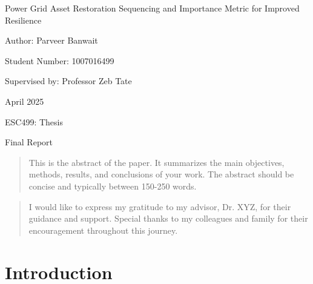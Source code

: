 \documentclass[12pt]{article}
\begin{document}
\setlength{\cftaftertoctitleskip}{2cm} %
\setlength{\cftafterloftitleskip}{2cm} %
\begin{titlepage}
    \centering %
    {\Huge Power Grid Asset Restoration Sequencing and Importance Metric for Improved Resilience \par} %
    \vspace{2cm}
    {\huge Author: Parveer Banwait \par}
    \vspace{0.25cm}
    {\large Student Number: 1007016499 \par}
    \vspace{1cm}
    {\Large Supervised by: Professor Zeb Tate \par}
    \vfill %
    {\Large April 2025 \par}
    \vspace{0.25cm}
    {\Large ESC499: Thesis \par}
    \vspace{0.25cm}
    {\Large Final Report \par}
\end{titlepage}
\vspace*{\fill}
\begin{abstract}
This is the abstract of the paper. It summarizes the main objectives, methods, results, and conclusions of your work. The abstract should be concise and typically between 150-250 words.
\end{abstract}
\vspace*{\fill}
\newpage
\renewcommand{\abstractname}{Acknowledgements}  %
\vspace*{\fill}
\begin{abstract}
I would like to express my gratitude to my advisor, Dr. XYZ, for their guidance and support. Special thanks to my colleagues and family for their encouragement throughout this journey.
\end{abstract}
\vspace*{\fill}

\newpage

\tableofcontents

\newpage

\listoffigures

\newpage
{}
\section{Introduction}
\end{document}

